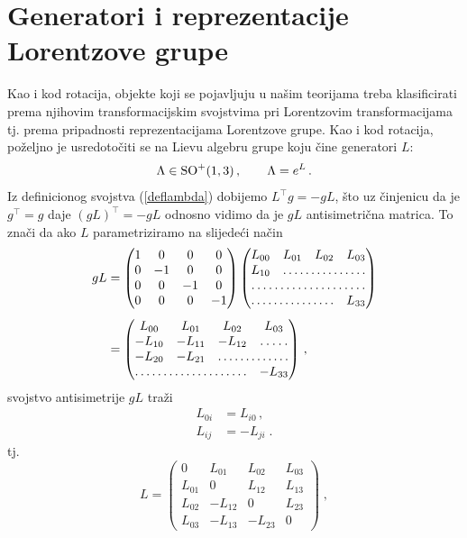 \section{Generatori i reprezentacije Lorentzove grupe}
\label{sec:genLor}

Kao i kod rotacija, objekte koji se pojavljuju u našim teorijama treba klasificirati prema
njihovim transformacijskim svojstvima pri Lorentzovim transformacijama
tj. prema pripadnosti reprezentacijama Lorentzove
grupe. Kao i kod rotacija, poželjno je usredotočiti se na Lievu algebru
grupe koju čine generatori $L$:
\begin{equation}
    \Lambda \in \mathrm{SO}^{+}(1,3) \,, \qquad \Lambda = e^L \,.
\end{equation}
Iz definicionog svojstva (\ref{deflambda}) dobijemo $L^\top g = -g L$,
što uz činjenicu da je $g^\top = g$ daje $(gL)^\top = -gL$ odnosno
vidimo da je $gL$ antisimetrična matrica. To znači da ako $L$
parametriziramo na slijedeći način
\begin{align}
 gL &= 
\begin{pmatrix}
1 & 0 & 0 & 0 \\
0 &-1 & 0 & 0 \\
0 & 0 &-1 & 0 \\
0 & 0 & 0 &-1
\end{pmatrix}
\begin{pmatrix}
L_{00} & L_{01} & L_{02} & L_{03}\\
L_{10} &\hdotsfor{3} \\
\hdotsfor{4} \\
\hdotsfor{3} & L_{33}
\end{pmatrix} \\[1ex]
&= 
\begin{pmatrix}
L_{00} & L_{01} & L_{02} & L_{03}\\
-L_{10} & -L_{11} & -L_{12} &\hdotsfor{1} \\
-L_{20} & -L_{21} & \hdotsfor{2} \\
\hdotsfor{3} & -L_{33}
\end{pmatrix} \,,
\end{align}
svojstvo antisimetrije $gL$ traži
\begin{align}
L_{0i} &= L_{i0} \,, \\
L_{ij} &= - L_{ji} \;.
\end{align}
tj.
\begin{equation}
 L = \begin{pmatrix}
0 & L_{01} & L_{02} & L_{03}\\
L_{01} & 0 & L_{12} & L_{13}\\
L_{02} & -L_{12} & 0& L_{23} \\
L_{03} & -L_{13} &-L_{23} & 0
\end{pmatrix} \;,
\end{equation}
